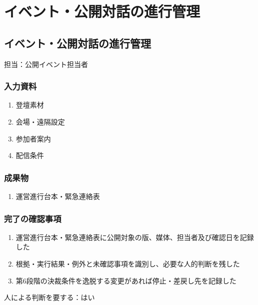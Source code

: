 \documentclass[a4paper,11pt]{article}
\begin{document}
\section{イベント・公開対話の進行管理}
\subsection{イベント・公開対話の進行管理}
\par 担当：公開イベント担当者\par\medskip
\subsubsection*{入力資料}
\begin{enumerate}[leftmargin=2em,itemsep=0.35em]
\item 登壇素材
\item 会場・遠隔設定
\item 参加者案内
\item 配信条件
\end{enumerate}
\subsubsection*{成果物}
\begin{enumerate}[leftmargin=2em,itemsep=0.35em]
\item 運営進行台本・緊急連絡表
\end{enumerate}
\subsubsection*{完了の確認事項}
\begin{enumerate}[leftmargin=2em,itemsep=0.35em]
\item 運営進行台本・緊急連絡表に公開対象の版、媒体、担当者及び確認日を記録した
\item 根拠・実行結果・例外と未確認事項を識別し、必要な人的判断を残した
\item 第6段階の決裁条件を逸脱する変更があれば停止・差戻し先を記録した
\end{enumerate}
\par 人による判断を要する：はい\par\medskip
\end{document}
